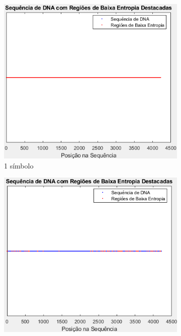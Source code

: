 \documentclass{article}
\begin{document}
\begin{figure}[h]
  \centering
  \begin{subfigure}{0.20\textwidth}
    \centering
    \includegraphics[width=\linewidth]{Janela1.png}
    \caption{1 símbolo }
  \end{subfigure}\hspace{1em}
  \begin{subfigure}{0.20\textwidth}
    \centering
    \includegraphics[width=\linewidth]{Janela10.png}

\end{subfigure}
\end{figure}
\end{document}
